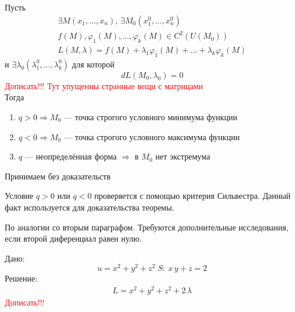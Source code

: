 \begin{Th}
    Пусть 
    \begin{gather*}
        \exists M(x_1, \dots, x_n), \, \exists M_0(x^0_1, \dots, x^0_n)\\
        f(M), \varphi_1(M), \dots, \varphi_k(M) \in C^2(U(M_0))\\
        L(M, \lambda) = f(M) + \lambda_1\varphi_1(M) + \dots + \lambda_k\varphi_k(M) 
    \end{gather*}
    и $\exists \lambda_0(\lambda^0_1, \dots, \lambda^0_k)$ для которой 
    \[
        dL(M_0, \lambda_0) = 0
    \]
    \textcolor{red}{Дописать!!! Тут упущенны странные вещи с матрицами}\\
    Тогда
    \begin{enumerate}
        \item $q > 0 \Rightarrow M_0$ --- точка строгого условного минимума функции
        
        \item $q < 0 \Rightarrow M_0$ --- точка строгого условного максимума функции
        
        \item $q$ --- неопределённая форма $\Rightarrow$ в $M_0$ нет экстремума 
    \end{enumerate}
\end{Th}
\begin{Proof}
    Принимаем без доказательств
\end{Proof}

\begin{Note}
    Условие $q > 0$ или $q < 0$ проверяется с помощью критерия Сильвестра. Данный факт используется для доказательства теоремы. 
\end{Note}

\begin{Note}
    По аналогии со вторым параграфом. Требуются дополнительные исследования, если второй диференциал равен нулю.
\end{Note}

\begin{Example}
    Дано:
    \[
        u = x^2 + y^2 + z^2 \; S:\: x\,y + z = 2
    \]
    Решение:
    \begin{align*}
        L = x^2 + y^2 + z^2 + 2\,\lambda
    \end{align*}
    \textcolor{red}{Дописать!!!}
\end{Example}